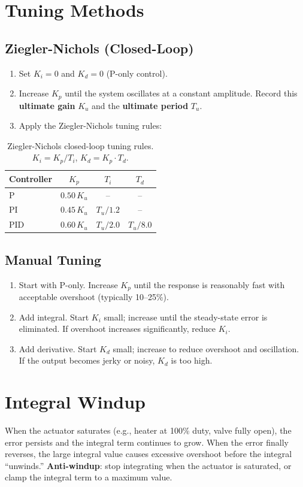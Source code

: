 \documentclass[11pt,letterpaper,twoside,openany]{book}
\begin{document}
\section{Tuning Methods}

\subsection{Ziegler-Nichols (Closed-Loop)}
\begin{enumerate}[nosep,leftmargin=1.5em]
\item Set $K_i = 0$ and $K_d = 0$ (P-only control).
\item Increase $K_p$ until the system oscillates at a constant amplitude. Record this \textbf{ultimate gain} $K_u$ and the \textbf{ultimate period} $T_u$.
\item Apply the Ziegler-Nichols tuning rules:
\end{enumerate}
\begin{table}[htbp]\centering\small
\begin{tabularx}{0.7\textwidth}{l c c c}
\toprule
\textbf{Controller} & $K_p$ & $T_i$ & $T_d$ \\
\midrule
P & $0.50 \, K_u$ & -- & -- \\
PI & $0.45 \, K_u$ & $T_u / 1.2$ & -- \\
PID & $0.60 \, K_u$ & $T_u / 2.0$ & $T_u / 8.0$ \\
\bottomrule
\end{tabularx}
\caption{Ziegler-Nichols closed-loop tuning rules. $K_i = K_p / T_i$, $K_d = K_p \cdot T_d$.}
\end{table}

\subsection{Manual Tuning}
\begin{enumerate}[nosep,leftmargin=1.5em]
\item Start with P-only. Increase $K_p$ until the response is reasonably fast with acceptable overshoot (typically 10--25\%).
\item Add integral. Start $K_i$ small; increase until the steady-state error is eliminated. If overshoot increases significantly, reduce $K_i$.
\item Add derivative. Start $K_d$ small; increase to reduce overshoot and oscillation. If the output becomes jerky or noisy, $K_d$ is too high.
\end{enumerate}

\section{Integral Windup}
When the actuator saturates (e.g., heater at 100\% duty, valve fully open), the error persists and the integral term continues to grow. When the error finally reverses, the large integral value causes excessive overshoot before the integral ``unwinds.'' \textbf{Anti-windup}: stop integrating when the actuator is saturated, or clamp the integral term to a maximum value.
\end{document}
